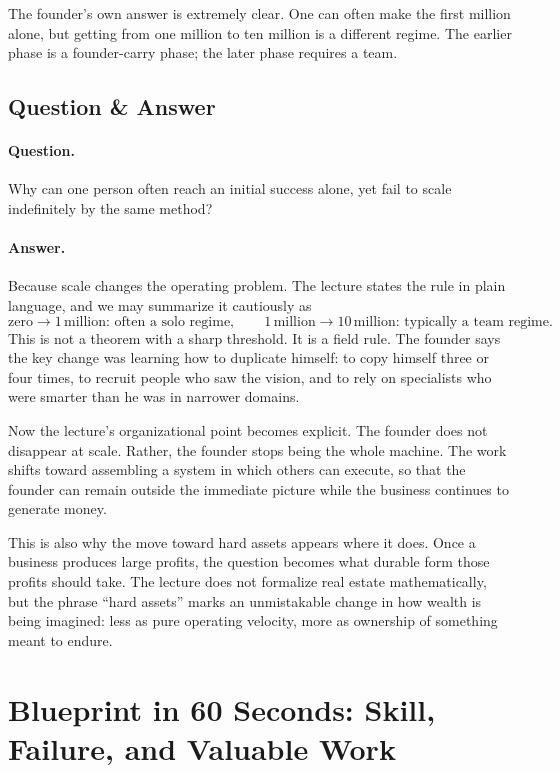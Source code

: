 The founder's own answer is extremely clear. One can often make the first million alone, but getting from one million to ten million is a different regime. The earlier phase is a founder-carry phase; the later phase requires a team.

\subsection{Question \& Answer}

\paragraph{Question.} Why can one person often reach an initial success alone, yet fail to scale indefinitely by the same method?

\paragraph{Answer.} Because scale changes the operating problem. The lecture states the rule in plain language, and we may summarize it cautiously as
\begin{equation}
\text{zero}\to 1\,\text{million: often a solo regime}, \qquad
1\,\text{million}\to 10\,\text{million: typically a team regime}.
\end{equation}
This is not a theorem with a sharp threshold. It is a field rule. The founder says the key change was learning how to duplicate himself: to copy himself three or four times, to recruit people who saw the vision, and to rely on specialists who were smarter than he was in narrower domains.

Now the lecture's organizational point becomes explicit. The founder does not disappear at scale. Rather, the founder stops being the whole machine. The work shifts toward assembling a system in which others can execute, so that the founder can remain outside the immediate picture while the business continues to generate money.

This is also why the move toward hard assets appears where it does. Once a business produces large profits, the question becomes what durable form those profits should take. The lecture does not formalize real estate mathematically, but the phrase ``hard assets'' marks an unmistakable change in how wealth is being imagined: less as pure operating velocity, more as ownership of something meant to endure.

\section{Blueprint in 60 Seconds: Skill, Failure, and Valuable Work}

